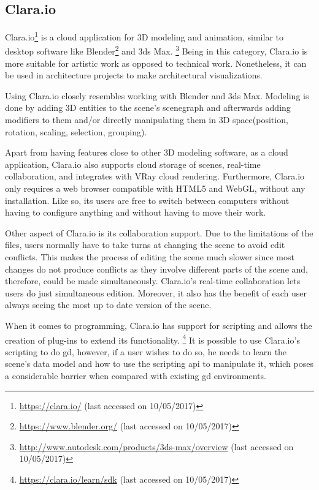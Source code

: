 \subsection{Clara.io}
Clara.io\footnote{\url{https://clara.io/} (last accessed on 10/05/2017)}\cite{houston2013clara} is a cloud application for 3D modeling and animation, similar to desktop software like Blender\footnote{\url{https://www.blender.org/} (last accessed on 10/05/2017)} and 3ds Max.%
\footnote{\url{http://www.autodesk.com/products/3ds-max/overview} (last accessed on 10/05/2017)}
Being in this category, Clara.io is more suitable for artistic work as opposed to technical work.
Nonetheless, it can be used in architecture projects to make architectural visualizations.

Using Clara.io closely resembles working with Blender and 3ds Max.
Modeling is done by adding 3D entities to the scene's scenegraph and afterwards adding modifiers to them and/or directly manipulating them in 3D space(position, rotation, scaling, selection, grouping).

Apart from having features close to other 3D modeling software, as a cloud application, Clara.io also supports cloud storage of scenes, real-time collaboration, and integrates with VRay cloud rendering.
Furthermore, Clara.io only requires a web browser compatible with HTML5\cite{hickson2011html5} and WebGL\cite{marrin2011webgl}, without any installation.
Like so, its users are free to switch between computers without having to configure anything and without having to move their work.

Other aspect of Clara.io is its collaboration support.
Due to the limitations of the files, users normally have to take turns at changing the scene to avoid edit conflicts.
This makes the process of editing the scene much slower since most changes do not produce conflicts as they involve different parts of the scene and, therefore, could be made simultaneously.
Clara.io's real-time collaboration lets users do just simultaneous edition.
Moreover, it also has the benefit of each user always seeing the most up to date version of the scene.

When it comes to programming, Clara.io has support for scripting and allows the creation of plug-ins to extend its functionality.%
\footnote{\url{https://clara.io/learn/sdk} (last accessed on 10/05/2017)}
It is possible to use Clara.io's scripting to do \gls{gd}, however, if a user wishes to do so, he needs to learn the scene's data model and how to use the scripting \gls{api} to manipulate it, which poses a considerable barrier when compared with existing \gls{gd} environments.


